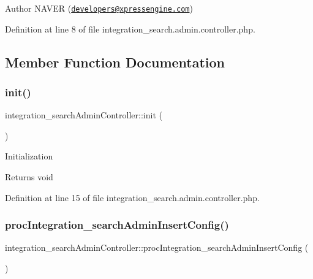 \begin{DoxyAuthor}{Author}
N\+A\+V\+ER (\href{mailto:developers@xpressengine.com}{\tt developers@xpressengine.\+com}) 
\end{DoxyAuthor}


Definition at line 8 of file integration\+\_\+search.\+admin.\+controller.\+php.



\subsection{Member Function Documentation}
\mbox{\label{classintegration__searchAdminController_af0bce7d6e800c43283d7ed9d59129888}} 
\subsubsection{\texorpdfstring{init()}{init()}}
{\footnotesize\ttfamily integration\+\_\+search\+Admin\+Controller\+::init (\begin{DoxyParamCaption}{ }\end{DoxyParamCaption})}

Initialization

\begin{DoxyReturn}{Returns}
void 
\end{DoxyReturn}


Definition at line 15 of file integration\+\_\+search.\+admin.\+controller.\+php.

\mbox{\label{classintegration__searchAdminController_aa5f35f169a96654f8fd8b9d824479693}} 
\subsubsection{\texorpdfstring{proc\+Integration\+\_\+search\+Admin\+Insert\+Config()}{procIntegration\_searchAdminInsertConfig()}}
{\footnotesize\ttfamily integration\+\_\+search\+Admin\+Controller\+::proc\+Integration\+\_\+search\+Admin\+Insert\+Config (\begin{DoxyParamCaption}{ }\end{DoxyParamCaption})}

